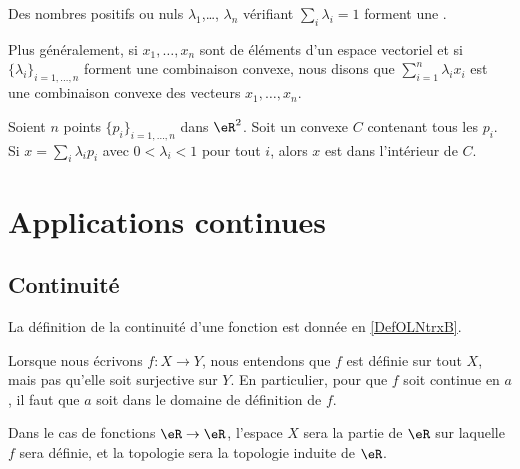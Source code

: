 \begin{definition}\label{DefIMZooLFdIUB}
	Des nombres positifs ou nuls \( \lambda_1\),\ldots, \( \lambda_n\) vérifiant \( \sum_i\lambda_i=1\) forment une .

	Plus généralement, si \( x_1,\ldots,x_n\) sont de éléments d'un espace vectoriel et si \( \{ \lambda_i \}_{i=1,\ldots,n}\) forment une combinaison convexe, nous disons que \( \sum_{i=1}^n\lambda_ix_i\) est une combinaison convexe des vecteurs \( x_1,\ldots, x_n\).
\end{definition}


\begin{proposition}	\label{PROPooZLJYooODQuZa}
	Soient \( n\) points \( \{ p_i \}_{i=1,\ldots,n}\) dans \( \eR^2\). Soit un convexe \( C\) contenant tous les \( p_i\). Si \( x=\sum_i\lambda_ip_i\) avec \( 0<\lambda_i<1\) pour tout \( i\), alors \( x\) est dans l'intérieur de \( C\).
\end{proposition}

\section{Applications continues}

\subsection{Continuité}

La définition de la continuité d'une fonction est donnée en \ref{DefOLNtrxB}.

\begin{normaltext}
	Lorsque nous écrivons \( f\colon X\to Y\), nous entendons que \( f\) est définie sur tout \( X\), mais pas qu'elle soit surjective sur \( Y\). En particulier, pour que \( f\) soit continue en \( a\), il faut que \( a\) soit dans le domaine de définition de \( f\).

	Dans le cas de fonctions \( \eR\to \eR\), l'espace \( X\) sera la partie de \( \eR\) sur laquelle \( f\) sera définie, et la topologie sera la topologie induite de \( \eR\).
\end{normaltext}

